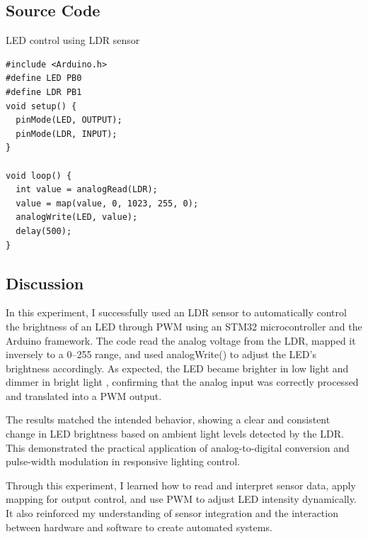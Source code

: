 \subsection{Source Code}

\begin{code}
\caption{LED control using LDR sensor}
\begin{verbatim}
#include <Arduino.h>
#define LED PB0
#define LDR PB1
void setup() {
  pinMode(LED, OUTPUT);
  pinMode(LDR, INPUT);
}

void loop() {
  int value = analogRead(LDR);
  value = map(value, 0, 1023, 255, 0);
  analogWrite(LED, value);
  delay(500);
}
\end{verbatim}
  \label{code:LDR}
\end{code}

\subsection{Discussion}
In this experiment, I successfully used an LDR sensor to automatically
control the brightness of an LED through PWM using an STM32 microcontroller
and the Arduino framework. The code read the analog voltage from the LDR,
mapped it inversely to a 0–255 range, and used analogWrite()
to adjust the LED's brightness accordingly.
As expected, the LED became brighter in low light and dimmer in bright light
, confirming that the analog input was correctly processed
and translated into a PWM output.

The results matched the intended behavior,
showing a clear and consistent change in LED brightness based on ambient
light levels detected by the LDR.
This demonstrated the practical application of analog-to-digital
conversion and pulse-width modulation in responsive lighting control.

Through this experiment, I learned how to read and interpret
sensor data, apply mapping for output control, and use PWM to adjust
LED intensity dynamically. It also reinforced my understanding of sensor
integration and the interaction between hardware and software
to create automated systems.

